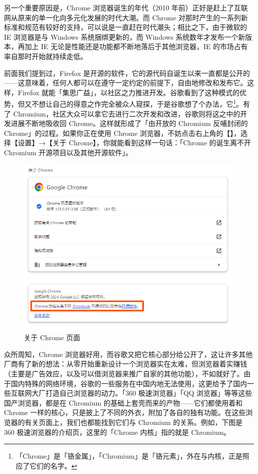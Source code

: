 \begin{note}
  另一个重要原因是，Chrome 浏览器诞生的年代（2010 年前）正好是赶上了互联网从原来的单一化向多元化发展的时代大潮。而 Chrome 对那时产生的一系列新标准和规范有较好的支持，可以说是一直赶在时代潮头；相比之下，由于微软的 IE 浏览器是与 Windows 系统捆绑更新的，而 Windows 系统数年才发布一个新版本，再加上 IE 无论是性能还是功能都不断地落后于其他浏览器，IE 的市场占有率自那时开始就持续走低。
\end{note}

前面我们提到过，Firefox 是开源的软件，它的源代码自诞生以来一直都是公开的——这意味着，任何人都可以在遵守一定约定的前提下，自由地修改和发布它。这样，Firefox 就能「集思广益」，以社区之力推进开发。谷歌看到了这种模式的优势，但又不想让自己的得意之作完全被众人窥探，于是谷歌想了个办法，它\footnote{「Chrome」是「铬金属」，「Chromium」是「铬元素」，外在与内核，正是照应了它们的名字。}。有了 Chromium，社区大众可以拿它去进行二次开发和改进，谷歌则将这之中的开发进展不断地吸收回 Chrome。这样就形成了「由开放的 Chromium 反哺封闭的 Chrome」的过程。如果你正在使用 Chrome 浏览器，不妨点击右上角的【】，选择【设置】→【关于 Chrome】，你就能看到这样一句话：「Chrome 的诞生离不开 Chromium 开源项目以及其他开源软件」。

\begin{figure}[htb!]
  \centering
  \includegraphics[width=.8\textwidth]{assets/software/About_chrome.png}
  \caption{关于 Chrome 页面}
  \label{fig:About_chrome}
\end{figure}

众所周知，Chrome 浏览器好用，而谷歌又把它核心部分给公开了，这让许多其他厂商有了新的想法：从零开始重新设计一个浏览器实在太难，但浏览器着实赚钱（主要是广告效应，以及可以借浏览器来推广自家的其他功能），不如就好了。由于国内特殊的网络环境，谷歌的一些服务在中国内地无法使用，这更给予了国内一些互联网大厂打造自己浏览器的动力。「360 极速浏览器」「QQ 浏览器」等等这些国产浏览器，都是在 Chromium 的基础上套壳而来的产物——它们都使用着和 Chrome 一样的核心，只是披上了不同的外衣，附加了各自的独有功能。在这些浏览器的有关页面上，我们也都能找到它们与 Chromium 的关系。例如，下图是 360 极速浏览器的介绍页，这里的「Chrome 内核」指的就是 Chromium。

